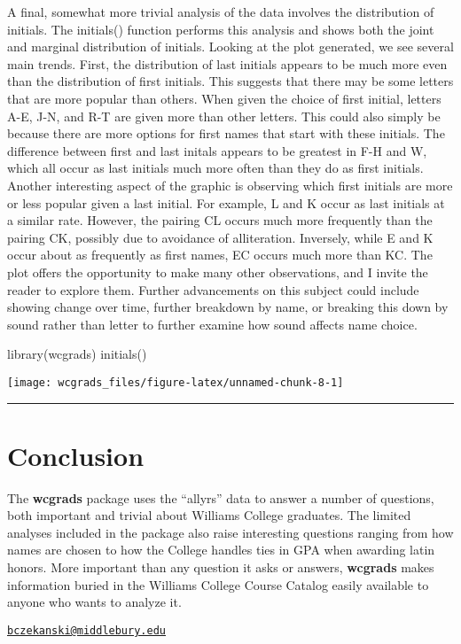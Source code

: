 A final, somewhat more trivial analysis of the data involves the
distribution of initials. The initials() function performs this analysis
and shows both the joint and marginal distribution of initials. Looking
at the plot generated, we see several main trends. First, the
distribution of last initials appears to be much more even than the
distribution of first initials. This suggests that there may be some
letters that are more popular than others. When given the choice of
first initial, letters A-E, J-N, and R-T are given more than other
letters. This could also simply be because there are more options for
first names that start with these initials. The difference between first
and last initals appears to be greatest in F-H and W, which all occur as
last initials much more often than they do as first initials. Another
interesting aspect of the graphic is observing which first initials are
more or less popular given a last initial. For example, L and K occur as
last initials at a similar rate. However, the pairing CL occurs much
more frequently than the pairing CK, possibly due to avoidance of
alliteration. Inversely, while E and K occur about as frequently as
first names, EC occurs much more than KC. The plot offers the
opportunity to make many other observations, and I invite the reader to
explore them. Further advancements on this subject could include showing
change over time, further breakdown by name, or breaking this down by
sound rather than letter to further examine how sound affects name
choice.

\begin{Schunk}
\begin{Sinput}
library(wcgrads)
initials()
\end{Sinput}

\texttt{[image: wcgrads\_files/figure-latex/unnamed-chunk-8-1]} \end{Schunk}

\begin{center}\rule{0.5\linewidth}{\linethickness}\end{center}

\section{Conclusion}\label{conclusion}

The \textbf{wcgrads} package uses the ``allyrs'' data to answer a number
of questions, both important and trivial about Williams College
graduates. The limited analyses included in the package also raise
interesting questions ranging from how names are chosen to how the
College handles ties in GPA when awarding latin honors. More important
than any question it asks or answers, \textbf{wcgrads} makes information
buried in the Williams College Course Catalog easily available to anyone
who wants to analyze it.

\address{%
Ben Czekanski\\
Middlebury College '18\\
\\
}
\href{mailto:bczekanski@middlebury.edu}{\nolinkurl{bczekanski@middlebury.edu}}


